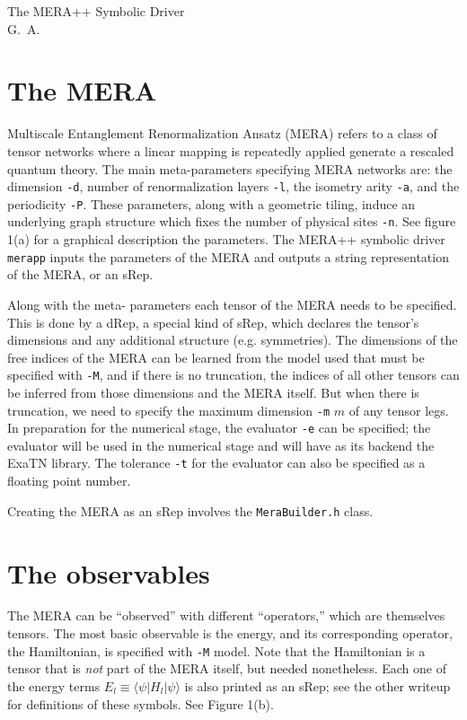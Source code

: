 \documentclass{article}
\newcommand{\code}[1]{\texttt{#1}}
\begin{document}
	\begin{center}
		{\LARGE The MERA++ Symbolic Driver}\vspace{0.5cm}\\
		
	{G.~A.}
	
\end{center}

\section{The MERA}
Multiscale Entanglement Renormalization Ansatz (MERA) refers to a class of tensor networks where a linear mapping is repeatedly applied generate a rescaled quantum theory. 
The main meta-parameters specifying MERA networks are: the dimension \code{-d}, number of renormalization layers \code{-l}, the isometry arity \code{-a}, and the periodicity \code{-P}. 
These parameters, along with a geometric tiling, induce an underlying graph structure which fixes the number of physical sites \code{-n}. 
See figure 1(a) for a graphical description the parameters.
The MERA++ symbolic driver \code{merapp} inputs the parameters of the MERA and outputs a string representation of the MERA, or an sRep.

Along with the meta- parameters each tensor of the MERA needs to be specified. 
This is done by a dRep, a special kind of sRep, which declares the tensor's dimensions and any additional structure (e.g. symmetries). 
The dimensions of the free indices of the MERA
can be learned from the model used that must be specified with \code{-M}, and if there is no truncation, the indices of all
other tensors can be inferred from those dimensions and the MERA itself. 
But when there is truncation, we need to specify the maximum dimension \code{-m} $m$
of any tensor legs. In preparation for the numerical stage, the evaluator \code{-e} can be specified;
the evaluator will be used in the numerical stage and will have as its backend the ExaTN library.
The tolerance \code{-t} for the evaluator can also be specified as a floating point number.

Creating the MERA as an sRep involves the \code{MeraBuilder.h} class.

\section{The observables}
The MERA can be ``observed'' with different ``operators,'' which are themselves tensors.
The most basic observable is the energy, and its corresponding operator, the Hamiltonian, is specified
with \code{-M} model. Note that the Hamiltonian is a tensor that is \emph{not} part of the MERA itself, but needed nonetheless.
Each one of the energy terms $E_l\equiv \langle \psi | H_l |\psi\rangle$ is also printed as an sRep; see the other writeup for definitions of these symbols.
See Figure 1(b).
\end{document}
